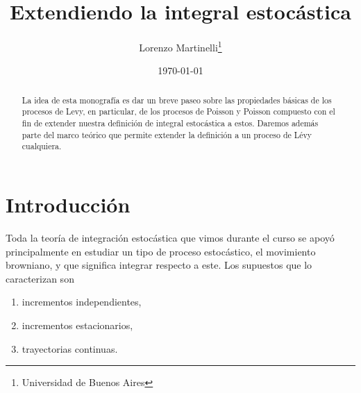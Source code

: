 \documentclass[
marginals=nomargin
]{kaohandt}
\begin{document}
	
	
	\title[]{Extendiendo la integral estocástica}
	
	\author[LM]{Lorenzo Martinelli\thanks{Universidad de Buenos Aires} }
	
	\date{\today}
	
	
	\maketitle
	
	\margintoc
	
	\begin{abstract}
		La idea de esta monografía es dar un breve paseo sobre las propiedades básicas de los procesos de Levy, en particular, de los procesos de Poisson y Poisson compuesto con el fin de extender nuestra definición de integral estocástica a estos. Daremos además parte del marco teórico que permite extender la definición a un proceso de Lévy cualquiera.
	\end{abstract}
	
	
	\medskip
	
	
	\section{Introducción}
		Toda la teoría de integración estocástica que vimos durante el curso se apoyó principalmente en estudiar un tipo de proceso estocástico, el movimiento browniano, y que significa integrar respecto a este. Los supuestos que lo caracterizan son
		
		\begin{enumerate}
			\item incrementos independientes,
			\item incrementos estacionarios,
			\item trayectorias continuas.
		\end{enumerate}
			
\end{document}
